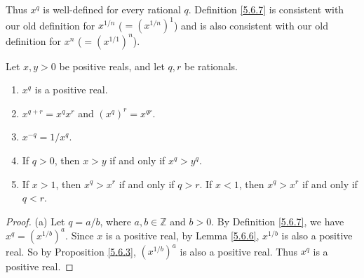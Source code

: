 \begin{note}
Thus \(x^q\) is well-defined for every rational \(q\).
Definition \ref{5.6.7} is consistent with our old definition for \(x^{1 / n}\) (\(= (x^{1 / n})^1\)) and is also consistent with our old definition for \(x^n\) (\(= (x^{1 / 1})^n\)).
\end{note}

\begin{lemma}\label{5.6.9}
Let \(x, y > 0\) be positive reals, and let \(q, r\) be rationals.
\begin{enumerate}
    \item \(x^q\) is a positive real.
    \item \(x^{q + r} = x^q x^r\) and \((x^q)^r = x^{qr}\).
    \item \(x^{-q} = 1 / x^q\).
    \item If \(q > 0\), then \(x > y\) if and only if \(x^q > y^q\).
    \item If \(x > 1\), then \(x^q > x^r\) if and only if \(q > r\).
    If \(x < 1\), then \(x^q > x^r\) if and only if \(q < r\).
\end{enumerate}
\end{lemma}

\begin{proof}{(a)}
Let \(q = a / b\), where \(a, b \in \mathds{Z}\) and \(b > 0\).
By Definition \ref{5.6.7}, we have \(x^q = (x^{1 / b})^a\).
Since \(x\) is a positive real, by Lemma \ref{5.6.6}, \(x^{1 / b}\) is also a positive real.
So by Proposition \ref{5.6.3}, \((x^{1 / b})^a\) is also a positive real.
Thus \(x^q\) is a positive real.
\end{proof}

